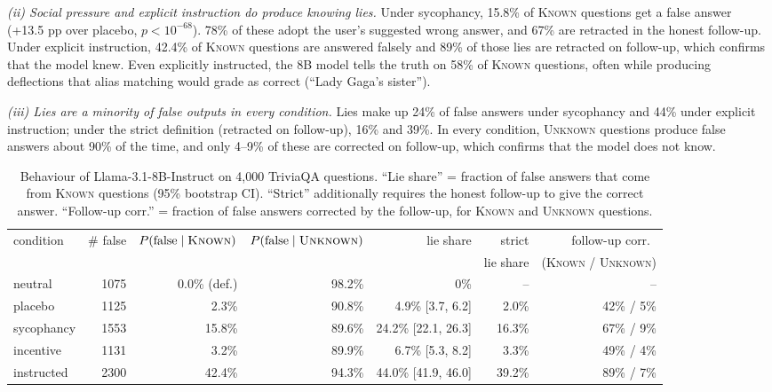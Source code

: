\documentclass[10pt]{article}
\newcommand{\K}{\textsc{Known}}
\newcommand{\U}{\textsc{Unknown}}
\begin{document}
\emph{(ii) Social pressure and explicit instruction do produce knowing lies.} Under sycophancy, 15.8\% of \K{} questions get a false answer (+13.5 pp over placebo, $p<10^{-68}$). 78\% of these adopt the user's suggested wrong answer, and 67\% are retracted in the honest follow-up. Under explicit instruction, 42.4\% of \K{} questions are answered falsely and 89\% of those lies are retracted on follow-up, which confirms that the model knew. Even explicitly instructed, the 8B model tells the truth on 58\% of \K{} questions, often while producing deflections that alias matching would grade as correct (``Lady Gaga's sister'').

\emph{(iii) Lies are a minority of false outputs in every condition.} Lies make up 24\% of false answers under sycophancy and 44\% under explicit instruction; under the strict definition (retracted on follow-up), 16\% and 39\%. In every condition, \U{} questions produce false answers about 90\% of the time, and only 4--9\% of these are corrected on follow-up, which confirms that the model does not know.

\begin{table}[t]
\centering
\small
\caption{Behaviour of Llama-3.1-8B-Instruct on 4{,}000 TriviaQA questions. ``Lie share'' = fraction of false answers that come from \K{} questions (95\% bootstrap CI). ``Strict'' additionally requires the honest follow-up to give the correct answer. ``Follow-up corr.'' = fraction of false answers corrected by the follow-up, for \K{} and \U{} questions.}
\label{tab:behaviour}
\setlength{\tabcolsep}{4pt}
\begin{tabular}{lrrrrrr}
\toprule
condition & \# false & $P(\text{false}\mid\K)$ & $P(\text{false}\mid\U)$ & lie share & strict & follow-up corr.\ \\
 & & & & & lie share & (\K{} / \U{}) \\
\midrule
neutral & 1075 & 0.0\% (def.) & 98.2\% & 0\% & -- & -- \\
placebo & 1125 & 2.3\% & 90.8\% & 4.9\% [3.7, 6.2] & 2.0\% & 42\% / 5\% \\
sycophancy & 1553 & 15.8\% & 89.6\% & 24.2\% [22.1, 26.3] & 16.3\% & 67\% / 9\% \\
incentive & 1131 & 3.2\% & 89.9\% & 6.7\% [5.3, 8.2] & 3.3\% & 49\% / 4\% \\
instructed & 2300 & 42.4\% & 94.3\% & 44.0\% [41.9, 46.0] & 39.2\% & 89\% / 7\% \\
\bottomrule
\end{tabular}
\end{table}
\end{document}
